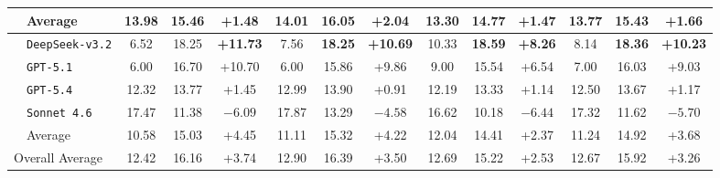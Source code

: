 \begin{extendedtable*}[t]
{\begin{tabular}{ll|ccc|ccc|ccc|ccc}
			\cmidrule(lr){2-14}
			 & Average & 13.98 & 15.46 & +1.48 & 14.01 & 16.05 & +2.04 & 13.30 & 14.77 & +1.47 & 13.77 & 15.43 & +1.66 \\
			\midrule
			\multirow{5}{*}{\shortstack[l]{\Paperthree}}			 & \texttt{DeepSeek-v3.2} & 6.52 & 18.25 & \textbf{+11.73} & 7.56 & \textbf{18.25} & \textbf{+10.69} & 10.33 & \textbf{18.59} & \textbf{+8.26} & 8.14 & \textbf{18.36} & \textbf{+10.23} \\
			 & \texttt{GPT-5.1} & 6.00 & 16.70 & +10.70 & 6.00 & 15.86 & +9.86 & 9.00 & 15.54 & +6.54 & 7.00 & 16.03 & +9.03 \\
			 & \texttt{GPT-5.4} & 12.32 & 13.77 & +1.45 & 12.99 & 13.90 & +0.91 & 12.19 & 13.33 & +1.14 & 12.50 & 13.67 & +1.17 \\
			 & \texttt{Sonnet 4.6} & 17.47 & 11.38 & $-6.09$ & 17.87 & 13.29 & $-4.58$ & 16.62 & 10.18 & $-6.44$ & 17.32 & 11.62 & $-5.70$ \\
			\cmidrule(lr){2-14}
			 & Average & 10.58 & 15.03 & +4.45 & 11.11 & 15.32 & +4.22 & 12.04 & 14.41 & +2.37 & 11.24 & 14.92 & +3.68 \\
			\midrule
			\multicolumn{2}{l|}{Overall Average} & 12.42 & 16.16 & +3.74 & 12.90 & 16.39 & +3.50 & 12.69 & 15.22 & +2.53 & 12.67 & 15.92 & +3.26 \\
			\bottomrule
		\end{tabular}
	}
\end{extendedtable*}
